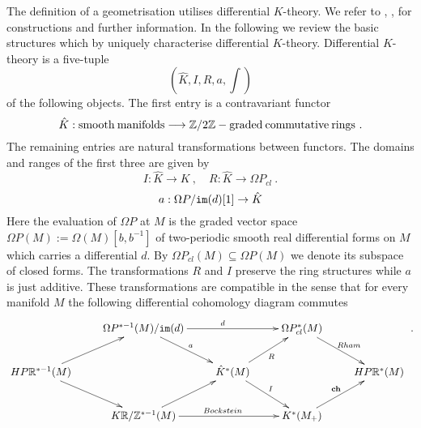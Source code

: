 \documentclass[12pt]{article}
\newcommand{\im}{{\tt im}}
\newcommand{\Z}{{\mathbb{Z}}}
\newcommand{\R}{{\mathbb{R}}}
\newcommand{\ch}{{\mathbf{ch}}}
\begin{document}
The definition of a geometrisation utilises differential $K$-theory. We refer to 
\cite{MR1769477}, \cite{MR2192936}, \cite{MR2664467} for constructions and further information. In the following we review the basic structures  which by  \cite{MR2608479} uniquely characterise differential $K$-theory.
%
Differential $K$-theory is a five-tuple
$$(\hat K,I,R,a,\int)$$
of the following objects.
The first entry is a contravariant functor
$$\hat K:{\rm smooth\: manifolds}\longrightarrow {\rm \Z/2\Z-graded \:commutative\:rings}\ .$$
The remaining entries are natural transformations between functors. 
The domains and ranges of the first three are given by 
$$I:\hat K\to K\ ,\quad R:\hat K\to \Omega P_{cl}\ .$$
$$a:\Omega P/\im(d)[1]\to \hat K$$
 Here the evaluation of $\Omega P$ at $M$ is the graded vector space  $\Omega P(M):=\Omega(M)[b,b^{-1}]$  of two-periodic smooth real differential forms on $M$ which carries a differential $d$. By 
$ \Omega P_{cl}(M)\subseteq \Omega P(M)$ we denote its  subspace of closed forms.
The transformations $R$ and $I$ preserve the ring structures while $a$ is just additive.
These transformations are compatible in the sense that
for every manifold $M$ the following differential cohomology  diagram commutes
$$\xymatrix{&\Omega P^{*-1}(M)/\im(d)\ar[dr]^{a}\ar[rr]^{d}&&\Omega P_{cl}^{*}(M)\ar[dr]^{Rham}&\\HP\R^{*-1}(M)\ar[ur]\ar[dr]&&\hat K^{*}(M)\ar[ur]_{R}\ar[dr]^{I}&&HP\R^{*}(M)\\&K\R/\Z^{*-1}(M)\ar[ur]\ar[rr]^{Bockstein}&&K^{*}(M_{+})\ar[ur]^{\ch}&}\ .$$
\end{document}

